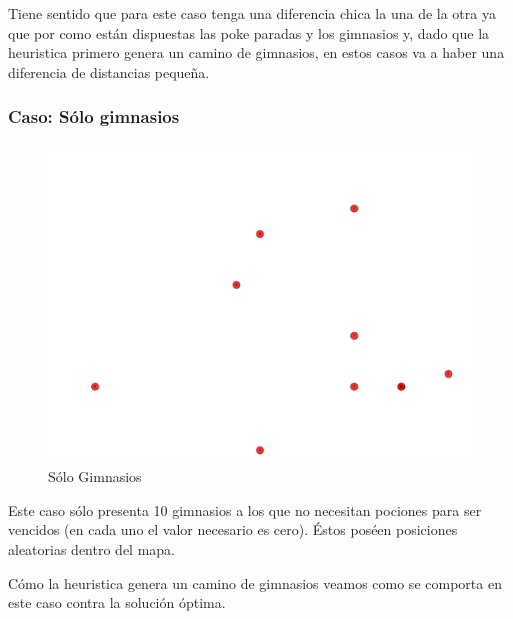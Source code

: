 Tiene sentido que para este caso tenga una diferencia chica la una de la otra ya que por como están dispuestas las poke paradas y los gimnasios y, dado que la heuristica primero genera un camino de gimnasios, en estos casos va a haber una diferencia de distancias pequeña.


\subsubsection{Caso: Sólo gimnasios}

\begin{figure}[H]
  \begin{center}
    \includegraphics[scale=0.4]{imagenes/test3.pdf}
    \caption{Sólo Gimnasios}
    \label{fig:ej2_caso3}
  \end{center}
\end{figure}

Este caso sólo presenta 10 gimnasios a los que no necesitan pociones para ser vencidos (en cada uno el valor necesario es cero). Éstos poséen posiciones aleatorias dentro del mapa.

Cómo la heuristica genera un camino de gimnasios veamos como se comporta en este caso contra la solución óptima.

